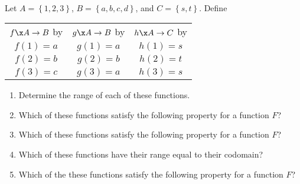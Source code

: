 \begin{previewactivity} \label{PA:functionswithfinitedom} \hfill \\
Let  $A = \left\{ {1,2,3} \right\}$, $B = \left\{ {a,b,c,d} \right\}$, and 
$C = \left\{ {s,t} \right\}$.  Define

\begin{center}
\begin{tabular}{c | c | c}
$f\x A \to B$ by &  $g\x A \to B$ by &  $h\x A \to C$ by \\
$f( 1 ) = a $  &  $g( 1 ) = a $  &  $h( 1 ) = s $ \\
$f( 2 ) = b $  &  $g( 2 ) = b $  &  $h( 2 ) = t $ \\
$f( 3 ) = c $  &  $g( 3 ) = a $  &  $h( 3 ) = s $
\end{tabular}
\end{center}
%
\begin{enumerate}
\item Determine the range of each of these functions.

\item Which of these functions satisfy the following property for a function  $F$?


\item Which of these functions satisfy the following property for a function  $F$?


\item Which of these functions have their range equal to their codomain?

\item Which of the these functions satisfy the following property for a function  $F$?

\end{enumerate}
\end{previewactivity}
